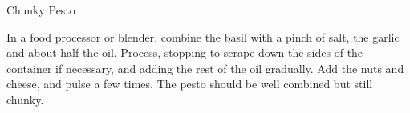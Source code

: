 \begin{recipe}[\vegan]{Chunky Pesto}
    \label{chunky_pesto}

    \begin{ingredients}
    \end{ingredients}

    \begin{instructions}
        In a food processor or blender, combine the basil with a pinch of salt, the garlic and about half the oil.
        Process, stopping to scrape down the sides of the container if necessary, and adding the rest of the oil gradually.
        Add the nuts and cheese, and pulse a few times.
        The pesto should be well combined but still chunky. 
    \end{instructions}
\end{recipe}
